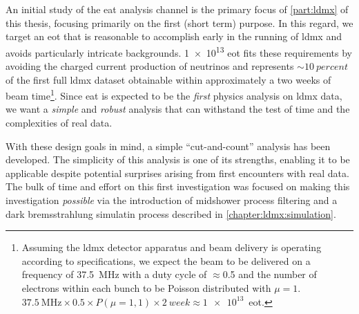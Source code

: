 An initial study of the \ac{eat} analysis channel is the primary focus of \cref{part:ldmx} of this
thesis, focusing primarily on the first (short term) purpose. In this regard, we target an \ac{eot}
that is reasonable to accomplish early in the running of \ac{ldmx} and avoids particularly
intricate backgrounds. \num{1e13} \ac{eot} fits these requirements by avoiding the charged current
production of neutrinos and represents $\sim\qty{10}{percent}$ of the first full \ac{ldmx} dataset
obtainable within approximately a two weeks of beam time\footnote{ Assuming the \ac{ldmx} detector
  apparatus and beam delivery is operating according to specifications, we expect the beam to be
  delivered on a frequency of \qty{37.5}{\mega\hertz} with a duty cycle of $\approx$\num{0.5} and the
  number of electrons within each bunch to be Poisson distributed with $\mu=1$.
  $\qty{37.5}{\mega\hertz}\times0.5\times P(\mu=1,1) \times\qty{2}{week}\approx\num{1e13}$~\ac{eot}.
}. Since \ac{eat} is expected to be the \emph{first} physics analysis on \ac{ldmx} data, we want a
\emph{simple} and \emph{robust} analysis that can withstand the test of time and the complexities
of real data.

With these design goals in mind, a simple ``cut-and-count'' analysis has been developed. The
simplicity of this analysis is one of its strengths, enabling it to be applicable despite potential
surprises arising from first encounters with real data. The bulk of time and effort on this first
investigation was focused on making this investigation \emph{possible} via the introduction of
midshower process filtering and a dark bremsstrahlung simulatin process described in
\cref{chapter:ldmx:simulation}.

